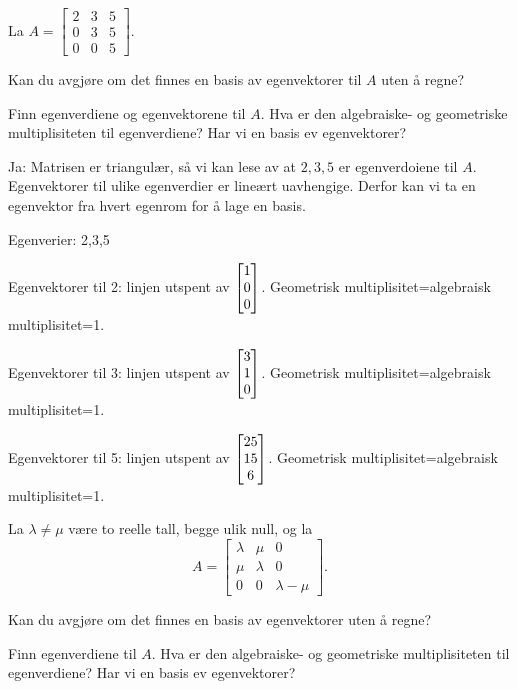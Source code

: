 \begin{oppgave}
La $A=\begin{bmatrix}
2 & 3 & 5\\
0 & 3 & 5\\
0 & 0 & 5
\end{bmatrix}$. 

\begin{punkt}
Kan du avgjøre om det finnes en basis av egenvektorer til $A$ uten å regne?
\end{punkt}

\begin{punkt}
Finn egenverdiene og egenvektorene til $A$. Hva er den algebraiske- og geometriske multiplisiteten til egenverdiene? Har vi en basis ev egenvektorer?
\end{punkt}
\end{oppgave}


\begin{losning}
\begin{punkt}
Ja: Matrisen er triangulær, så vi kan lese av at $2,3,5$ er egenverdoiene til $A$. Egenvektorer til ulike egenverdier er lineært uavhengige. Derfor kan vi ta en egenvektor fra hvert egenrom for å lage en basis.
\end{punkt}

\begin{punkt}
Egenverier: 2,3,5

\noindent
Egenvektorer til  2: linjen utspent av $\begin{bmatrix} 1 \\ 0 \\ 0 \end{bmatrix}$. Geometrisk multiplisitet=algebraisk multiplisitet=1.

\noindent
Egenvektorer til  3: linjen utspent av $\begin{bmatrix} 3 \\ 1 \\ 0 \end{bmatrix}$. Geometrisk multiplisitet=algebraisk multiplisitet=1.

\noindent
Egenvektorer til  5: linjen utspent av $\begin{bmatrix} 25 \\ 15 \\ 6 \end{bmatrix}$. Geometrisk multiplisitet=algebraisk multiplisitet=1.


\end{punkt}

\end{losning}


\begin{oppgave}

La $\lambda\neq \mu$ være to reelle tall, begge ulik null, og la
$$A=
\begin{bmatrix}
\lambda & \mu & 0\\
\mu & \lambda & 0\\
0 & 0 & \lambda-\mu
\end{bmatrix}.$$
\begin{punkt}
Kan du avgjøre om det finnes en basis av egenvektorer uten å regne?
\end{punkt}
\begin{punkt}
Finn egenverdiene til $A$. Hva er den algebraiske- og geometriske multiplisiteten til egenverdiene? Har vi en basis ev egenvektorer?
\end{punkt}
\end{oppgave}

